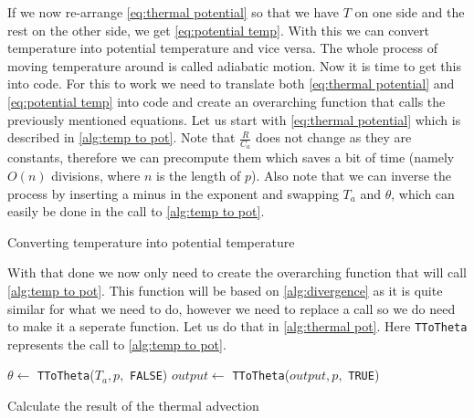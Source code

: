 If we now re-arrange \autoref{eq:thermal potential} so that we have $T$ on one side and the rest on the other side, we get \autoref{eq:potential temp}. With this we can convert temperature into 
potential temperature and vice versa. The whole process of moving temperature around is called adiabatic motion. Now it is time to get this into code. For this to work we need to translate both 
\autoref{eq:thermal potential} and \autoref{eq:potential temp} into code and create an overarching function that calls the previously mentioned equations. Let us start with 
\autoref{eq:thermal potential} which is described in \autoref{alg:temp to pot}. Note that $\frac{R}{C_a}$ does not change as they are constants, therefore we can precompute them which saves 
a bit of time (namely $O(n)$ divisions, where $n$ is the length of $p$). Also note that we can inverse the process by inserting a minus in the exponent and swapping $T_a$ 
and $\theta$, which can easily be done in the call to \autoref{alg:temp to pot}.

\begin{algorithm}
    \Return{$\theta$}
    \caption{Converting temperature into potential temperature}
    \label{alg:temp to pot}
\end{algorithm}

With that done we now only need to create the overarching function that will call \autoref{alg:temp to pot}. This function will be based on \autoref{alg:divergence} as it is quite similar for 
what we need to do, however we need to replace a call so we do need to make it a seperate function. Let us do that in \autoref{alg:thermal pot}. Here \texttt{TToTheta} represents the call to 
\autoref{alg:temp to pot}.

\begin{algorithm}[!hbt]
    $\theta \leftarrow $ \texttt{TToTheta}($T_a, p,$ \texttt{FALSE}) \;
    $output \leftarrow $ \texttt{TToTheta}($output, p,$ \texttt{TRUE}) \;
     \;
    \caption{Calculate the result of the thermal advection}
    \label{alg:thermal pot}
\end{algorithm}

